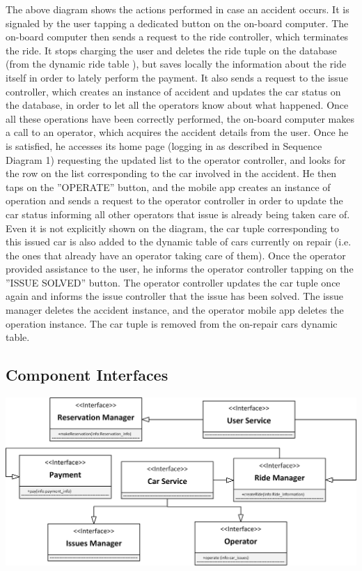 \documentclass{article}
\begin{document}
\begin{flushleft}
The above diagram shows the actions performed in case an accident occurs. It is signaled by the user tapping a dedicated button on the on-board computer. The on-board computer then sends a request to the ride controller, which terminates the ride. It stops charging the user and deletes the ride tuple on the database (from the dynamic ride table ), but saves locally the information about the ride itself in order to lately perform the payment. It also sends a request to the issue controller, which creates an instance of accident and updates the car status on the database, in order to let all the operators know about what happened.  Once all these operations have been correctly performed, the on-board computer makes a call to an operator, which acquires the accident details from the user. Once he is satisfied, he accesses its home page (logging in as described in Sequence Diagram 1) requesting the updated list to the operator controller, and looks for the row on the list corresponding to the car involved in the accident. He then taps on the ''OPERATE'' button, and the mobile app creates an instance of operation and sends a request to the operator controller in order to update the car status informing all other operators that issue is already being taken care of. Even it is not explicitly shown on the diagram, the car tuple corresponding to this issued car is also added to the dynamic table of cars currently on repair (i.e. the ones that already have an operator taking care of them). Once the operator provided assistance to the user, he informs the operator controller tapping on the ''ISSUE SOLVED'' button. The operator controller updates the car tuple once again and informs the issue controller that the issue has been solved. The issue manager deletes the accident instance, and the operator mobile app deletes the operation instance. The car tuple is removed from the on-repair cars dynamic table.


\newpage

\subsection{Component Interfaces} %
\includegraphics[scale=0.7]{interface} 


\end{flushleft}
\end{document}
